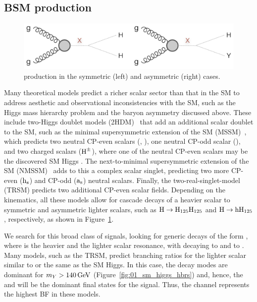 \subsection{BSM \texorpdfstring{\XHY}{X→HY} production}
\label{sec:05_bsmxhy}

\begin{figure}[htb] %
    \centering
    \includegraphics[width=\textwidth]{figures/05-HH/production/xhy.png}
    \caption{\XHY production in the symmetric (left) and asymmetric (right) cases.}
    \label{fig:05_xhy_production}
\end{figure} 

Many theoretical models predict a richer scalar sector than that in the SM to address aesthetic and observational inconsistencies with the SM, such as the Higgs mass hierarchy problem and the baryon asymmetry discussed above.
These include two-Higgs doublet models (2HDM)~\cite{Branco:2011iw} that add an additional scalar doublet to the SM, such as the minimal supersymmetric extension of the SM (MSSM)~\cite{Craig:2013hca}, which predicts two neutral CP-even scalars (\PH, \Ph), one neutral CP-odd scalar (\PA), and two charged scalars ($\textrm{H}^\pm$), where one of the neutral CP-even scalars may be the discovered SM Higgs \PHsm.
The next-to-minimal supersymmetric extension of the SM (NMSSM)~\cite{Domingo:2022kfm} adds to this a complex scalar singlet, predicting two more CP-even ($\textrm{h}_{\mathrm{s}}$) and CP-odd ($\textrm{a}_{\mathrm{s}}$) neutral scalars.
Finally, the two-real-singlet-model (TRSM) predicts two additional CP-even scalar fields.
Depending on the kinematics, all these models allow for cascade decays of a heavier scalar to symmetric and asymmetric lighter scalars, such as $\textrm{H}\to\textrm{H}_{125}\textrm{H}_{125}$ and $\textrm{H}\to\textrm{h}\textrm{H}_{125}$, respectively, as shown in Figure~\ref{fig:05_xhy_production}.

We search for this broad class of signals, looking for generic decays of the form \XHY, where \PX is the heavier and \PY the lighter scalar resonance, with \PH decaying to \bbbar and \PY to \VVq. 
Many models, such as the TRSM, predict branching ratios for the lighter scalar similar to or the same as the SM Higgs.
In this case, the \VV decay modes are dominant for ${m_Y} > 140\,\text{Ge\hspace{-.08em}V}$ (Figure~\ref{fig:01_sm_higgs_hbrs}) and, hence, the \hbb and \yvv will be the dominant final states for the \XHY signal.
Thus, the \bbvv channel represents the highest BF in these models.

